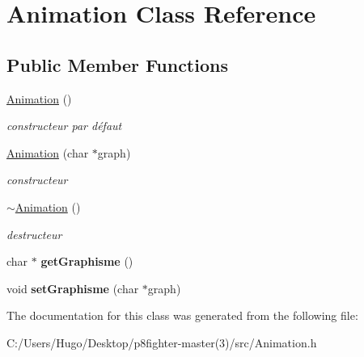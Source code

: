 \hypertarget{class_animation}{}\section{Animation Class Reference}
\label{class_animation}
\subsection*{Public Member Functions}
\begin{DoxyCompactItemize}
\item 
\mbox{\label{class_animation_a83f0a16cef7117f187ad596de38dd9d6}} 
\hyperlink{class_animation_a83f0a16cef7117f187ad596de38dd9d6}{Animation} ()
\begin{DoxyCompactList}\small\item\em constructeur par défaut \end{DoxyCompactList}\item 
\mbox{\label{class_animation_a9267d384937fe411afe9abf04b3c1330}} 
\hyperlink{class_animation_a9267d384937fe411afe9abf04b3c1330}{Animation} (char $\ast$graph)
\begin{DoxyCompactList}\small\item\em constructeur \end{DoxyCompactList}\item 
\mbox{\label{class_animation_a401b68793d4fbf48d481c030ee4b2a16}} 
\hyperlink{class_animation_a401b68793d4fbf48d481c030ee4b2a16}{$\sim$\+Animation} ()
\begin{DoxyCompactList}\small\item\em destructeur \end{DoxyCompactList}\item 
\mbox{\label{class_animation_a6ab83c78d8e3e064b0f7df68305bd591}} 
char $\ast$ {\bfseries get\+Graphisme} ()
\item 
\mbox{\label{class_animation_ac2857dceaa7878680e97c20d24546c59}} 
void {\bfseries set\+Graphisme} (char $\ast$graph)
\end{DoxyCompactItemize}


The documentation for this class was generated from the following file\+:\begin{DoxyCompactItemize}
\item 
C\+:/\+Users/\+Hugo/\+Desktop/p8fighter-\/master(3)/src/Animation.\+h\end{DoxyCompactItemize}
